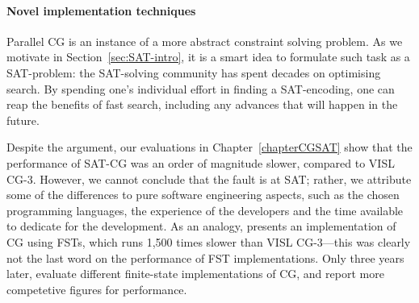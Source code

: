 











\paragraph{Novel implementation techniques} 
Parallel CG is an instance of a more abstract constraint solving problem.
As we motivate in Section~\ref{sec:SAT-intro}, it is a smart idea to formulate such task as a SAT-problem: the SAT-solving community has spent decades on optimising search. By spending one's individual effort in finding a SAT-encoding, one can reap the benefits of
fast search, including any advances that will happen in the future.

Despite the argument, our evaluations in Chapter~\ref{chapterCGSAT} show that the performance of SAT-CG was an order of magnitude slower, compared to VISL CG-3. 
However, we cannot conclude that the fault is at SAT; rather, we attribute some of the differences to pure software engineering aspects, such as the chosen programming languages, the experience of the developers and the time available to dedicate for the development.
As an analogy, \cite{peltonen2011} presents an implementation of CG using FSTs, which runs 1,500 times slower than VISL CG-3---this was clearly not the last word on the performance of FST implementations. Only three years later, \cite{nemeskey14} evaluate different finite-state implementations of CG, and report more competetive figures for performance.

